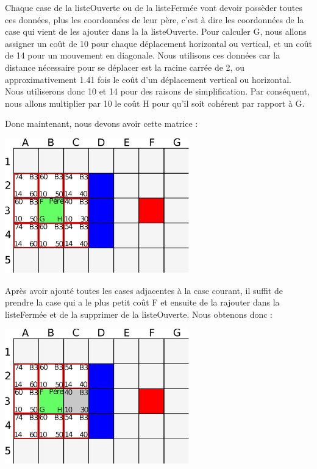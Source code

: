 			Chaque case de la listeOuverte ou de la listeFermée vont devoir possèder toutes ces données, plus les coordonnées de leur père, c'est à dire les coordonnées de la case qui vient de les ajouter dans la la listeOuverte. Pour calculer G, nous allons assigner un coût de 10 pour chaque déplacement horizontal ou vertical, et un coût de 14 pour un mouvement en diagonale. Nous utilisons ces données car la distance nécessaire pour se déplacer est la racine carrée de 2, ou approximativement 1.41 fois le coût d'un déplacement vertical ou horizontal. Nous utiliserons donc 10 et 14 pour des raisons de simplification. Par conséquent, nous allons multiplier par 10 le coût H pour qu'il soit cohérent par rapport à G.
	
			Donc maintenant, nous devons avoir cette matrice :
			\begin{center}
				\includegraphics[width=8cm]{./Analyse/Img/Grille3.eps}
			\end{center}
		
			Après avoir ajouté toutes les cases adjacentes à la case courant, il suffit de prendre la case qui a le plus petit coût F et ensuite de la rajouter dans la listeFermée et de la supprimer de la listeOuverte. Nous obtenons donc :
			\begin{center}
				\includegraphics[width=8cm]{./Analyse/Img/Grille4.eps}
			\end{center}
		
